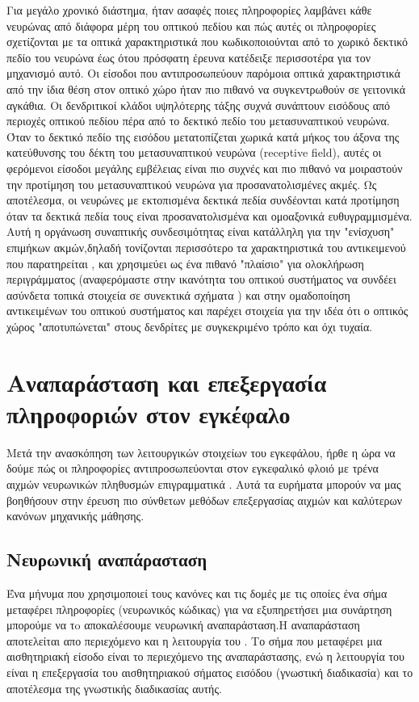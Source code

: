 \documentclass[12pt]{report}
\begin{document}
Για μεγάλο χρονικό διάστημα, ήταν ασαφές ποιες πληροφορίες λαμβάνει κάθε νευρώνας από διάφορα μέρη του οπτικού πεδίου και πώς αυτές οι πληροφορίες σχετίζονται με τα οπτικά χαρακτηριστικά που κωδικοποιούνται από το χωρικό δεκτικό πεδίο του νευρώνα έως ότου πρόσφατη έρευνα κατέδειξε περισσοτέρα για τον μηχανισμό αυτό. Οι είσοδοι που αντιπροσωπεύουν παρόμοια οπτικά χαρακτηριστικά από την ίδια θέση στον οπτικό χώρο ήταν πιο πιθανό να συγκεντρωθούν σε γειτονικά αγκάθια. Οι δενδριτικοί κλάδοι υψηλότερης τάξης συχνά συνάπτουν εισόδους από περιοχές οπτικού πεδίου πέρα από το δεκτικό πεδίο του μετασυναπτικού νευρώνα. Όταν το δεκτικό πεδίο της εισόδου μετατοπίζεται χωρικά κατά μήκος του άξονα της κατεύθυνσης του δέκτη του μετασυναπτικού νευρώνα (\textlatin{receptive field}), αυτές οι φερόμενοι είσοδοι μεγάλης εμβέλειας είναι πιο συχνές και πιο πιθανό να μοιραστούν την προτίμηση του μετασυναπτικού νευρώνα για προσανατολισμένες ακμές. Ως αποτέλεσμα, οι νευρώνες με εκτοπισμένα δεκτικά πεδία συνδέονται κατά προτίμηση όταν τα δεκτικά πεδία τους είναι προσανατολισμένα και ομοαξονικά ευθυγραμμισμένα. Αυτή η οργάνωση συναπτικής συνδεσιμότητας είναι κατάλληλη για την "ενίσχυση" επιμήκων ακμών,δηλαδή τονίζονται περισσότερο τα χαρακτηριστικά του αντικειμενού που παρατηρείται , και χρησιμεύει ως ένα πιθανό "πλαίσιο" για ολοκλήρωση περιγράμματος (αναφερόμαστε στην ικανότητα του οπτικού συστήματος να συνδέει ασύνδετα τοπικά στοιχεία σε συνεκτικά σχήματα \cite{persike2016}) και στην ομαδοποίηση αντικειμένων του οπτικού συστήματος \cite{Iacaruso2017} και παρέχει στοιχεία για την ιδέα ότι ο οπτικός χώρος "αποτυπώνεται" στους δενδρίτες με συγκεκριμένο τρόπο και όχι τυχαία.


\section{Αναπαράσταση και επεξεργασία πληροφοριών στον εγκέφαλο}
Μετά την ανασκόπηση των λειτουργικών στοιχείων του εγκεφάλου, ήρθε η ώρα να δούμε πώς οι πληροφορίες αντιπροσωπεύονται στον εγκεφαλικό φλοιό με τρένα αιχμών νευρωνικών πληθυσμών επιγραμματικά . Αυτά τα ευρήματα μπορούν να μας βοηθήσουν στην έρευση πιο σύνθετων μεθόδων επεξεργασίας αιχμών και καλύτερων κανόνων μηχανικής μάθησης.
\subsection{Νευρωνική αναπάρασταση}

Ένα μήνυμα που χρησιμοποιεί τους κανόνες και τις δομές με τις οποίες ένα σήμα μεταφέρει πληροφορίες (νευρωνικός κώδικας) για να εξυπηρετήσει μια συνάρτηση μπορούμε να τo αποκαλέσουμε νευρωνική αναπαράσταση.Η αναπαράσταση αποτελείται απο περιεχόμενο και η λειτουργία του . Το σήμα που μεταφέρει μια αισθητηριακή είσοδο είναι το περιεχόμενο της αναπαράστασης, ενώ η λειτουργία του είναι η επεξεργασία του αισθητηριακού σήματος εισόδου (γνωστική διαδικασία) και το αποτέλεσμα της γνωστικής διαδικασίας αυτής.
\end{document}
